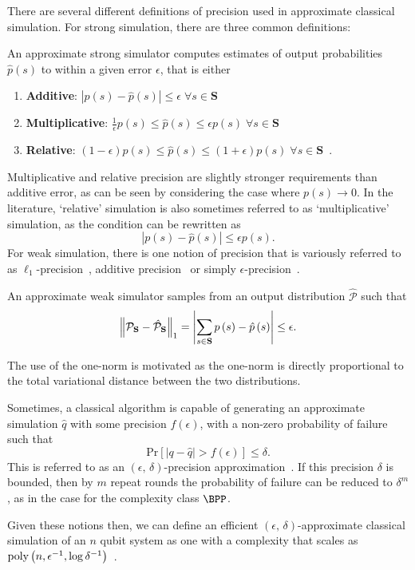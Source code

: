 There are several different definitions of precision used in approximate classical simulation. For strong simulation, there are three common definitions:
\begin{defn}\label{def:approximate_strong}
An approximate strong simulator computes estimates of output probabilities $\hat{p}\left(s\right)$ to within a given error $\epsilon$, that is either
\begin{enumerate}
    \item \textbf{Additive}: $\left|p\left(s\right)-\hat{p}\left(s\right)\right| \leq \epsilon\;\forall s\in\mathbf{S}$~\cite{Pashayan2017}
    \item \textbf{Multiplicative}: $\frac{1}{\epsilon}p\left(s\right)\leq \hat{p}\left(s\right) \leq \epsilon p\left(s\right)\;\forall s\in\mathbf{S}$~\cite{Hangleiter2017}
    \item \textbf{Relative}: $\left(1-\epsilon\right)p\left(s\right) \leq \hat{p}\left(s\right) \leq \left(1+\epsilon\right)p\left(s\right) \;\forall s\in\mathbf{S} $~\cite{Bravyi2016,Hangleiter2017}.
\end{enumerate}
\end{defn}
Multiplicative and relative precision are slightly stronger requirements than additive error, as can be seen by considering the case where $p\left(s\right)\rightarrow 0$. In the literature, `relative' simulation is also sometimes referred to as `multiplicative' simulation, as the condition can be rewritten as~\cite{Pashayan2017}
\[\left|p\left(s\right)-\hat{p}\left(s\right)\right| \leq \epsilon p\left(s\right).\]
For weak simulation, there is one notion of precision that is variously referred to as $\ell_{1}$-precision~\cite{Bremner2011}, additive precision~\cite{Yoganathan2019} or simply $\epsilon$-precision~\cite{Pashayan2017}.
\begin{defn}\label{def:approximate_weak}
An approximate weak simulator samples from an output distribution $\hat{\mathcal{P}}$ such that
\[ \norm{\mathcal{P}_{\mathbf{S}}-\hat{\mathcal{P}}_{\mathbf{S}}}_{1} = \left|\sum_{s\in \mathbf{S}} p\left(s\right) - \hat{p}\left(s\right)\right| \leq \epsilon.\]
\end{defn}
The use of the one-norm is motivated as the one-norm is directly proportional to the total variational distance between the two distributions.\par
Sometimes, a classical algorithm is capable of generating an approximate simulation $\hat{q}$ with some precision $f\left(\epsilon\right)$, with a non-zero probability of failure such that
\[\text{Pr}\left[\left|q-\hat{q}\right| > f\left(\epsilon\right)\right]\leq \delta.\]
This is referred to as an $\left(\epsilon,\,\delta\right)$-precision approximation~\cite{Pashayan2017}. If this precision $\delta$ is bounded, then by $m$ repeat rounds the probability of failure can be reduced to $\delta^{m}$, as in the case for the complexity class $\BPP$.\par
Given these notions then, we can define an efficient $\left(\epsilon,\,\delta\right)$-approximate classical simulation of an $n$ qubit system as one with a complexity that scales as $\text{poly} \left(n, \epsilon^{-1}, \log{\delta^{-1}}\right)$~\cite{Pashayan2017}.
